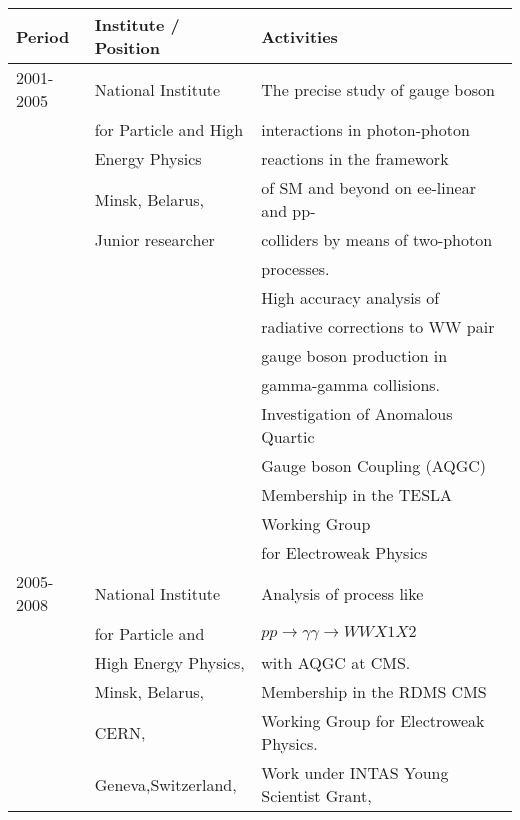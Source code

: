 {{\begin{tabular}{lll}
Period         & Institute / Position            & Activities                     \\
\hline
2001-2005      & National Institute     &  The precise study of  gauge boson      \\
               & for Particle and High  &  interactions in photon-photon          \\
               & Energy Physics         &  reactions in the framework             \\
               & Minsk, Belarus,        &  of SM and beyond on ee-linear and pp-  \\
               & Junior researcher      &  colliders by means of two-photon       \\
               &                        &  processes.                             \\
               &                        &  High accuracy analysis of              \\
               &                        &  radiative corrections to WW pair       \\
               &                        &  gauge boson production in              \\ 
               &                        &  gamma-gamma collisions.                \\
	       & 			&  Investigation of Anomalous Quartic     \\
	       &			&  Gauge  boson Coupling (AQGC)           \\
	       &			&  Membership in the TESLA		  \\
	       &			&  Working Group			  \\
	       &			&  for Electroweak Physics		  \\
\hline
2005-2008      & National Institute     &  Analysis of process like               \\ 
               & for Particle and 	&  $pp\rightarrow\gamma\gamma\rightarrow WWX1X2$   \\ 
	       & High Energy Physics,        &  with AQGC at CMS.                      \\
               & Minsk, Belarus,        &  Membership in the RDMS CMS 		  \\ 
               & CERN,                  &  Working Group for Electroweak Physics. \\
               & Geneva,Switzerland,    &  Work under INTAS Young Scientist Grant,\\

\end{tabular}}}
